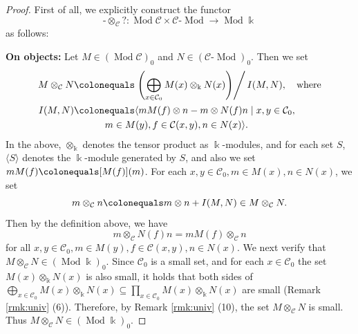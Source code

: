 \documentclass{surv-l}
\numberwithin{equation}{chapter}
\numberwithin{figure}{chapter}
\theoremstyle{plain}
\theoremstyle{definition}
\theoremstyle{remark}
\newcommand{\lMod}{\text{-}\!\Mod}
\DeclareMathOperator{\Mod}{Mod}
\DeclareMathOperator{\blank}{-}
\begin{document}
\begin{proof}
First of all, we explicitly construct the functor
\[
\blank \otimes_{\mathcal{C}} ?  \colon \Mod {\mathcal{C}} \times {\mathcal{C}}\text{-}\Mod \to \Mod \Bbbk
\]
as follows:

{\bf On objects:}
Let $M \in (\Mod {\mathcal{C}})_0$ and $N \in ({\mathcal{C}}\lMod)_0$.
Then we set
\begin{equation}\label{eq:dfn-tensor-small}
\begin{aligned}
M \otimes_{\mathcal{C}} N&\colonequals  \left.\left(\bigoplus_{x \in {\mathcal{C}}_0} M(x) \otimes_\Bbbk N(x)\right)\right/I(M,N), \quad \text{where}\\
I(M,N)&\colonequals \langle m M(f) \otimes n - m  \otimes N(f)n \mid x, y \in {\mathcal{C}}_0,\\
& \hspace{3.2em} m \in M(y), f \in {\mathcal{C}}(x,y), n \in N(x) \rangle.
\end{aligned}
\end{equation}
In the above, $\otimes_\Bbbk$ denotes the tensor product as $\Bbbk$-modules, and
for each set $S$,
${\langle S \rangle}$ denotes the $\Bbbk$-module generated by $S$, and also
we set $mM(f)\colonequals  [M(f)](m)$.
For each $x,y \in {\mathcal{C}}_0, m \in M(x), n \in N(x)$, we set
\[
m \otimes_{\mathcal{C}} n\colonequals  m \otimes n + I(M,N) \in M \otimes_{\mathcal{C}} N.
\]
Then by the definition above, we have
\[
m \otimes_{\mathcal{C}} N(f)n = m M(f) \otimes_{\mathcal{C}} n
\]
for all $x, y \in {\mathcal{C}}_0, m \in M(y), f \in {\mathcal{C}}(x,y), n \in N(x)$.
We next verify that $M \otimes_{\mathcal{C}} N \in (\Mod \Bbbk)_0$.
Since ${\mathcal{C}}_0$ is a small set, and for each
$x \in {\mathcal{C}}_0$ the set $M(x) \otimes_\Bbbk N(x)$ is also small,
it holds that both sides of
$\bigoplus_{x \in {\mathcal{C}}_0} M(x) \otimes_\Bbbk N(x) \subseteq \prod_{x \in {\mathcal{C}}_0} M(x) \otimes_\Bbbk N(x)$
are small (Remark \ref{rmk:univ} (6)).
Therefore, by Remark \ref{rmk:univ} (10),
the set $M \otimes_{\mathcal{C}} N$ is small.
Thus $M \otimes_{\mathcal{C}} N \in (\Mod \Bbbk)_0$.


\end{proof}
\end{document}
